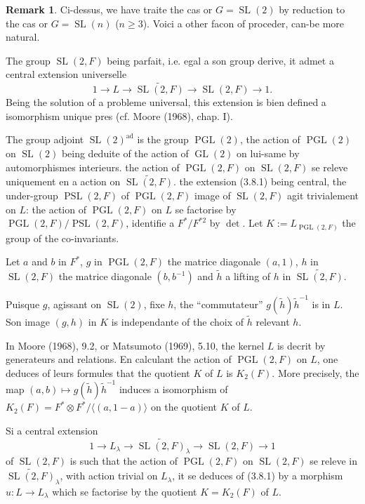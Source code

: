 \documentclass[11pt,a4paper]{article}
\theoremstyle{plain}
\theoremstyle{definition}
\newtheorem{remark}[theorem]{Remark}
\DeclareMathOperator{\PGL}{PGL}
\DeclareMathOperator{\PSL}{PSL}
\DeclareMathOperator{\SL}{SL}
\DeclareMathOperator{\GL}{GL}
\DeclareMathOperator{\ad}{ad}
\begin{document}
\begin{remark}\label{3.8}
Ci-dessus, we have traite the cas or $G = \SL(2)$ by reduction to the cas or $G = \SL(n)$ ($n \geq 3$). Voici a other facon of proceder, can-be more natural.

The group $\SL(2, F)$ being parfait, i.e. egal a son group derive, it admet a central extension universelle
\begin{equation}\label{3.8.1}
1 \to L \to \widetilde{\SL(2, F)} \to \SL(2, F) \to 1.
\end{equation}
Being the solution of a probleme universal, this extension is bien defined a isomorphism unique pres (cf. Moore (1968), chap. I).

The group adjoint $\SL(2)^{\ad}$ is the group $\PGL(2)$, the action of $\PGL(2)$ on $\SL(2)$ being deduite of the action of $\GL(2)$ on lui-same by automorphismes interieurs. the action of $\PGL(2, F)$ on $\SL(2, F)$ se releve uniquement en a action on $\widetilde{\SL(2, F)}$. the extension (3.8.1) being central, the under-group $\PSL(2, F)$ of $\PGL(2, F)$ image of $\SL(2, F)$ agit trivialement on $L$: the action of $\PGL(2, F)$ on $L$ se factorise by $\PGL(2, F)/\PSL(2, F)$, identifie a $F^*/F^{*2}$ by $\det$. Let $K := L_{\PGL(2, F)}$ the group of the co-invariants.

Let $a$ and $b$ in $F^*$, $g$ in $\PGL(2, F)$ the matrice diagonale $(a, 1)$, $h$ in $\SL(2, F)$ the matrice diagonale $(b, b^{-1})$ and $\tilde{h}$ a lifting of $h$ in $\widetilde{\SL(2, F)}$.

Puisque $g$, agissant on $\SL(2)$, fixe $h$, the ``commutateur'' $g(\tilde{h}) \tilde{h}^{-1}$ is in $L$. Son image $(g, h)$ in $K$ is independante of the choix of $\tilde{h}$ relevant $h$.

In Moore (1968), 9.2, or Matsumoto (1969), 5.10, the kernel $L$ is decrit by generateurs and relations. En calculant the action of $\PGL(2, F)$ on $L$, one deduces of leurs formules that the quotient $K$ of $L$ is $K_2(F)$. More precisely, the map $(a, b) \mapsto g(\tilde{h}) \tilde{h}^{-1}$ induces a isomorphism of $K_2(F) = F^* \otimes F^*/\langle (a, 1-a) \rangle$ on the quotient $K$ of $L$.

Si a central extension
\begin{equation}\label{3.8.2}
1 \to L_\lambda \to \widetilde{\SL(2, F)}_\lambda \to \SL(2, F) \to 1
\end{equation}
of $\SL(2, F)$ is such that the action of $\PGL(2, F)$ on $\SL(2, F)$ se releve in $\widetilde{\SL(2, F)}_\lambda$, with action trivial on $L_\lambda$, it se deduces of (3.8.1) by a morphism $u : L \to L_\lambda$ which se factorise by the quotient $K = K_2(F)$ of $L$.


\end{remark}
\end{document}
